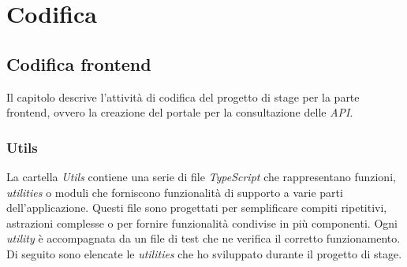 \chapter{Codifica}\label{cap:codifica}


\section{Codifica frontend}\label{sec:codifica-front-end}
Il capitolo descrive l'attività di codifica del progetto di stage per la parte frontend, ovvero la creazione del portale per la consultazione delle \textit{API}.

\subsection{Utils}\label{subsec:utils}
La cartella \textit{Utils} contiene una serie di file \textit{TypeScript} che rappresentano funzioni, \textit{utilities} o moduli che forniscono funzionalità di supporto a varie parti dell'applicazione.
Questi file sono progettati per semplificare compiti ripetitivi, astrazioni complesse o per fornire funzionalità condivise in più componenti. Ogni \textit{utility} è accompagnata 
da un file di test che ne verifica il corretto funzionamento.\\
Di seguito sono elencate le \textit{utilities} che ho sviluppato durante il progetto di stage.

